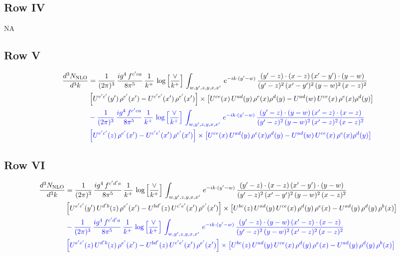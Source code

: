 \documentclass[9pt]{article}
\numberwithin{equation}{section}
\newcommand{\nc}{\color{blue}}
\begin{document}
\subsection{Row IV}
\textsc{NA}
\subsection{Row V}
\begin{align}
\frac{d^{3}N_{\rm NLO}}{d^{3}k} & = \frac{1}{(2\pi)^{3}}\, \frac{ig^{4}\,f^{c'ca}}{8\pi^{5}}\, \frac{1}{k^{+}}\,\log{\left[\frac{\vee}{k^{+}}\right]}\,\int_{w,y',z,y,x,x'}\, e^{-ik\cdot (y'-w)}\,\frac{(y'-z)\cdot (x-z)\,(x'-y')\cdot (y-w)}{(y'-z)^{2}\,(x'-y')^{2}\,(y-w)^{2}\,(x-z)^{2}}\notag \\
& \left[U^{e'c'}(y')\,\rho^{e'}(x')-U^{c'e'}(x')\,\rho^{e'}(x')\right]\times \left[U^{ce}(x)\,U^{ad}(y)\,\rho^{e}(x)\rho^{d}(y)-U^{ad}(w)\,U^{ce}(x)\,\rho^{e}(x)\rho^{d}(y)\right]\notag \\
& \nc -\frac{1}{(2\pi)^{3}}\, \frac{ig^{4}\,f^{c'ca}}{8\pi^{5}}\, \frac{1}{k^{+}}\,\log{\left[\frac{\vee}{k^{+}}\right]}\,\int_{w,y',z,y,x,x'}\, e^{-ik\cdot (y'-w)}\,\frac{(y'-z)\cdot (y-w)\,(x'-z)\cdot (x-z)}{(y'-z)^{2}\,(y-w)^{2}\,(x'-z)^{2}\,(x-z)^{2}}\notag \\
& \nc \left[U^{e'c'}(z)\,\rho^{e'}(x')-U^{c'e'}(x')\,\rho^{e'}(x')\right]\times \left[U^{ce}(x)\,U^{ad}(y)\,\rho^{e}(x)\rho^{d}(y)-U^{ad}(w)\,U^{ce}(x)\,\rho^{e}(x)\rho^{d}(y)\right]
\end{align}
\subsection{Row VI}
\begin{align}
\frac{d^{3}N_{\rm NLO}}{d^{3}k} & = \frac{1}{(2\pi)^{3}}\, \frac{ig^{4}\,f^{c'd'a}}{8\pi^{5}}\, \frac{1}{k^{+}}\,\log{\left[\frac{\vee}{k^{+}}\right]}\,\int_{w,y',z,y,x,x'}\, e^{-ik\cdot (y'-w)}\,\frac{(y'-z)\cdot (x-z)\,(x'-y')\cdot (y-w)}{(y'-z)^{2}\,(x'-y')^{2}\,(y-w)^{2}\,(x-z)^{2}}\notag \\
& \left[U^{e'c'}(y')\,U^{d'b}(z)\,\rho^{e'}(x')-U^{bd'}(z)\,U^{c'e'}(x')\,\rho^{e'}(x')\right]\times \left[U^{bc}(z)\,U^{ad}(y)\,U^{ce}(x)\,\rho^{d}(y)\,\rho^{e}(x)-U^{ad}(y)\,\rho^{d}(y)\,\rho^{b}(x)\right]\notag \\
& \nc -\frac{1}{(2\pi)^{3}}\, \frac{ig^{4}\,f^{c'd'a}}{8\pi^{5}}\, \frac{1}{k^{+}}\,\log{\left[\frac{\vee}{k^{+}}\right]}\,\int_{w,y',z,y,x,x'}\, e^{-ik\cdot (y'-w)}\,\frac{(y'-z)\cdot (y-w)\,(x'-z)\cdot (x-z)}{(y'-z)^{2}\,(y-w)^{2}\,(x'-z)^{2}\,(x-z)^{2}}\notag \\
& \nc \left[U^{e'c'}(z)\,U^{d'b}(z)\,\rho^{e'}(x')-U^{bd'}(z)\,U^{c'e'}(x')\,\rho^{e'}(x')\right]\times \left[U^{bc}(z)\,U^{ad}(y)\,U^{ce}(x)\,\rho^{d}(y)\,\rho^{e}(x)-U^{ad}(y)\,\rho^{d}(y)\,\rho^{b}(x)\right]
\end{align}
\end{document}
